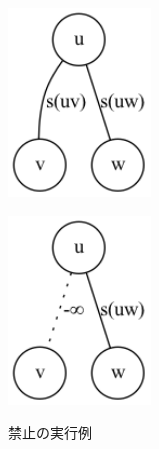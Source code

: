 \documentclass[10.5,a4paper,titlepage, dvipdfmx]{bxjsarticle}
\begin{document}
\begin{figure}[H]
    \centering
    \begin{minipage}{0.48\hsize}
        \centering
        \includegraphics[height=5cm]{forbid.png}
        \label{fig:left}
    \end{minipage}
    \begin{minipage}{0.48\hsize}
        \centering
        \includegraphics[height=5cm]{forbid_.png}
        \label{fig:right}
    \end{minipage}
    \caption{禁止の実行例}
    \label{fig:left_right}
\end{figure}
\end{document}

